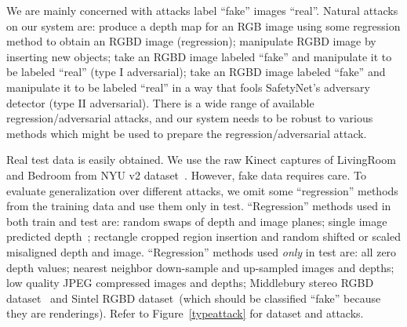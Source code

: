 \documentclass[10pt,twocolumn,letterpaper]{article}
\begin{document}
We are mainly concerned with attacks label ``fake'' images ``real''.  Natural attacks on our system
are: produce a depth map for an RGB image using some regression method to obtain an RGBD image (regression); 
manipulate RGBD image by inserting new objects; 
take an RGBD image labeled ``fake'' and manipulate it to be labeled ``real'' (type I adversarial);  
take an RGBD image labeled ``fake'' and manipulate it to be labeled ``real'' in a way that fools SafetyNet's adversary
detector (type II adversarial).   There is a wide range of available regression/adversarial attacks, and our system needs
to be robust to various methods which might be used to prepare the regression/adversarial attack.  

Real test data is easily obtained.  We use the raw Kinect captures of LivingRoom and Bedroom from NYU v2 dataset~\cite{Silberman:ECCV12}.  
However, fake data requires care.  To evaluate generalization over
different attacks, we omit some ``regression'' methods from the training data and use them only in test.
``Regression'' methods used in both train and test are: random swaps of depth and image planes; single image predicted depth~\cite{eigen2014depth}; 
rectangle cropped region insertion and random shifted or scaled misaligned depth and image. 
``Regression'' methods used {\em only} in test are:  all zero depth values; nearest neighbor down-sample and up-sampled images
and depths;  low quality JPEG compressed images and depths;  Middlebury stereo RGBD 
dataset~\cite{scharstein2014high} and Sintel RGBD dataset~\cite{Butler:ECCV:2012}(which should be classified ``fake'' because they are renderings). 
Refer to Figure~\ref{typeattack} for dataset and attacks. 
\end{document}
